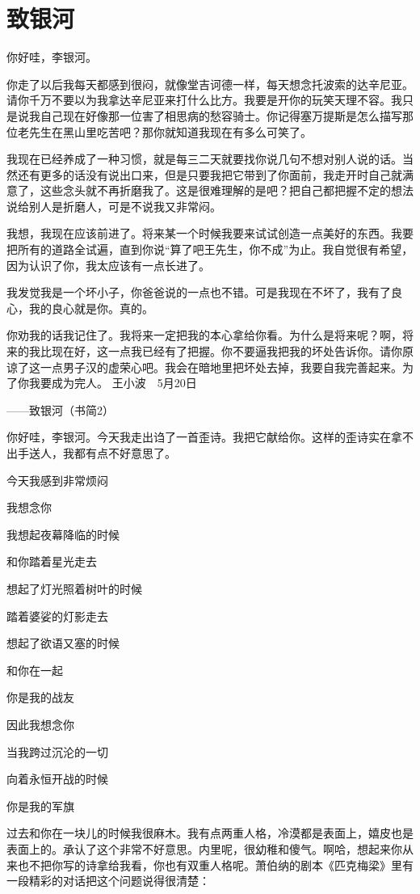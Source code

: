 \chapter{致银河}

你好哇，李银河。 

你走了以后我每天都感到很闷，就像堂吉诃德一样，每天想念托波索的达辛尼亚。请你千万不要以为我拿达辛尼亚来打什么比方。我要是开你的玩笑天理不容。我只是说我自己现在好像那一位害了相思病的愁容骑士。你记得塞万提斯是怎么描写那位老先生在黑山里吃苦吧？那你就知道我现在有多么可笑了。　 

我现在已经养成了一种习惯，就是每三二天就要找你说几句不想对别人说的话。当然还有更多的话没有说出口来，但是只要我把它带到了你面前，我走开时自己就满意了，这些念头就不再折磨我了。这是很难理解的是吧？把自己都把握不定的想法说给别人是折磨人，可是不说我又非常闷。 

我想，我现在应该前进了。将来某一个时候我要来试试创造一点美好的东西。我要把所有的道路全试遍，直到你说“算了吧王先生，你不成”为止。我自觉很有希望，因为认识了你，我太应该有一点长进了。 

我发觉我是一个坏小子，你爸爸说的一点也不错。可是我现在不坏了，我有了良心，我的良心就是你。真的。 

你劝我的话我记住了。我将来一定把我的本心拿给你看。为什么是将来呢？啊，将来的我比现在好，这一点我已经有了把握。你不要逼我把我的坏处告诉你。请你原谅了这一点男子汉的虚荣心吧。我会在暗地里把坏处去掉，我要自我完善起来。为了你我要成为完人。 王小波　5月20日

——致银河（书简2） 

你好哇，李银河。今天我走出诌了一首歪诗。我把它献给你。这样的歪诗实在拿不出手送人，我都有点不好意思了。 

今天我感到非常烦闷 

我想念你 

我想起夜幕降临的时候 

和你踏着星光走去 

想起了灯光照着树叶的时候 

踏着婆娑的灯影走去 

想起了欲语又塞的时候 

和你在一起 

你是我的战友 

因此我想念你 

当我跨过沉沦的一切 

向着永恒开战的时候 

你是我的军旗 

过去和你在一块儿的时候我很麻木。我有点两重人格，冷漠都是表面上，嬉皮也是表面上的。承认了这个非常不好意思。内里呢，很幼稚和傻气。啊哈，想起来你从来也不把你写的诗拿给我看，你也有双重人格呢。萧伯纳的剧本《匹克梅梁》里有一段精彩的对话把这个问题说得很清楚： 

